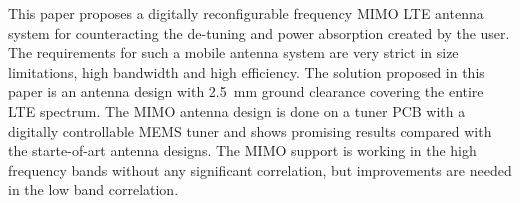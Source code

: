 This paper proposes a digitally reconfigurable frequency MIMO LTE antenna system for counteracting the de-tuning and power absorption created by the user. The requirements for such a mobile antenna system are very strict in size limitations, high bandwidth and high efficiency. The solution proposed in this paper is an antenna design with \SI{2.5}{mm} ground clearance covering the entire LTE spectrum. 
The MIMO antenna design is done on a tuner PCB with a digitally controllable MEMS tuner and shows promising results compared with the starte-of-art antenna designs. The MIMO support is working in the high frequency bands without any significant correlation, but improvements are needed in the low band correlation.  

% 
% 
% 
% 
% 
% 
